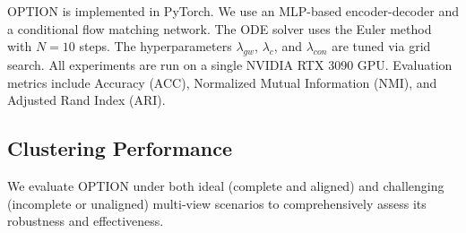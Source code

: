 \documentclass{article}
\theoremstyle{plain}
\theoremstyle{definition}
\theoremstyle{remark}
\begin{document}
OPTION is implemented in PyTorch. We use an MLP-based encoder-decoder and a conditional flow matching network. The ODE solver uses the Euler method with $N=10$ steps. The hyperparameters $\lambda_{gw}$, $\lambda_{c}$, and $\lambda_{con}$ are tuned via grid search. All experiments are run on a single NVIDIA RTX 3090 GPU. Evaluation metrics include Accuracy (ACC), Normalized Mutual Information (NMI), and Adjusted Rand Index (ARI).

\subsection{Clustering Performance}
\label{subsec:main_results}

We evaluate OPTION under both ideal (complete and aligned) and challenging (incomplete or unaligned) multi-view scenarios to comprehensively assess its robustness and effectiveness. 

\end{document}
